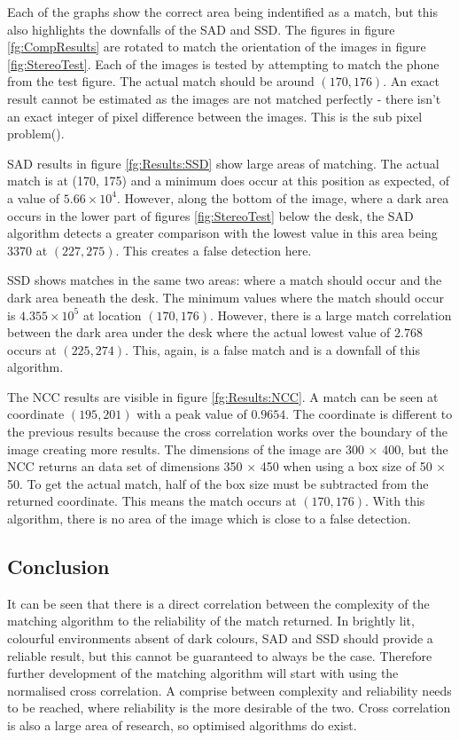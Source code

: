 Each of the graphs show the correct area being indentified as a match, but this also highlights the downfalls of the SAD and SSD. The figures in figure \ref{fg:CompResults} are rotated to match the orientation of the images in figure \ref{fig:StereoTest}. Each of the images is tested by attempting to match the phone from the test figure. The actual match should be around $(170, 176)$. An exact result cannot be estimated as the images are not matched perfectly - there isn't an exact integer of pixel difference between the images. This is the sub pixel problem(\cite{haller2012design}).

SAD results in figure \ref{fg:Results:SSD} show large areas of matching. The actual match is at (170, 175) and a minimum does occur at this position as expected, of a value of $5.66\times 10^4$. However, along the bottom of the image, where a dark area occurs in the lower part of figures \ref{fig:StereoTest} below the desk, the SAD algorithm detects a greater comparison with the lowest value in this area being $3370$ at $(227, 275)$. This creates a false detection here. 

SSD shows matches in the same two areas: where a match should occur and the dark area beneath the desk. The minimum values where the match should occur is $4.355 \times 10^5$ at location $(170,176)$. However, there is a large match correlation between the dark area under the desk where the actual lowest value of $2.768$ occurs at $(225,274)$. This, again, is a false match and is a downfall of this algorithm. 

The NCC results are visible in figure \ref{fg:Results:NCC}. A match can be seen at coordinate $(195,201)$ with a peak value of $0.9654$. The coordinate is different to the previous results because the cross correlation works over the boundary of the image creating more results. The dimensions of the image are 300 $\times$ 400, but the NCC returns an data set of dimensions 350 $\times$ 450 when using a box size of 50 $\times$ 50. To get the actual match, half of the box size must be subtracted from the returned coordinate. This means the match occurs at $(170,176)$. With this algorithm, there is no area of the image which is close to a false detection. 

\subsection{Conclusion}
It can be seen that there is a direct correlation between the complexity of the matching algorithm to the reliability of the match returned. In brightly lit, colourful environments absent of dark colours, SAD and SSD should provide a reliable result, but this cannot be guaranteed to always be the case. Therefore further development of the matching algorithm will start with using the normalised cross correlation. A comprise between complexity and reliability needs to be reached, where reliability is the more desirable of the two. Cross correlation is also a large area of research, so optimised algorithms do exist.

